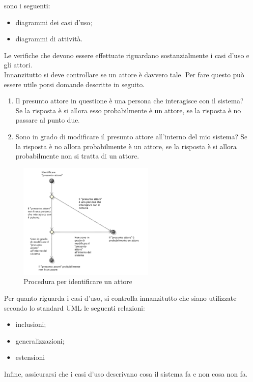 			sono i seguenti:
			\begin{itemize}
				\item diagrammi dei casi d'uso;
				\item diagrammi di attività.
			\end{itemize}
				Le verifiche che devono essere effettuate riguardano sostanzialmente i casi d'uso e gli attori.\\
				Innanzitutto si deve controllare se un attore è davvero tale. Per fare questo può essere utile porsi domande descritte in seguito.
				\begin{enumerate}
					\item Il presunto attore in questione è una persona che interagisce con il sistema? Se la risposta è si allora esso probabilmente è un attore, se la risposta è no passare al punto due.
					\item Sono in grado di modificare il presunto attore all'interno del mio sistema? Se la risposta è no allora probabilmente è un attore, se la risposta è si allora probabilmente non si tratta di un attore.
				\end{enumerate}
				\begin{figure}[H]
					\centering
					\includegraphics[width=0.6\textwidth]{NormeDiProgetto/Pics/VerificaAttori}
					\caption{Procedura per identificare un attore}
				\end{figure}
				Per quanto riguarda i casi d'uso, si controlla innanzitutto che siano utilizzate secondo lo standard UML le seguenti relazioni:
				\begin{itemize}
					\item inclusioni;
					\item generalizzazioni;
					\item estensioni
				\end{itemize}
				Infine, assicurarsi che i casi d'uso descrivano cosa il sistema fa e non cosa non fa.
